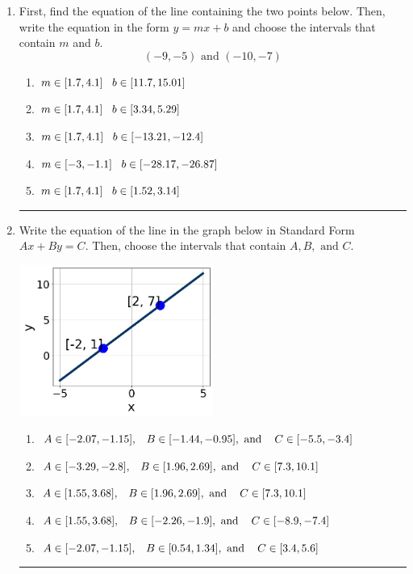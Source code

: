 \documentclass[14pt]{extbook}
\newcommand{\litem}[1]{\item#1\hspace*{-1cm}\rule{\textwidth}{0.4pt}}
\begin{document}
\begin{enumerate}
{\begin{enumerate}[label=\Alph*.]
\end{enumerate} }
\litem{
First, find the equation of the line containing the two points below. Then, write the equation in the form $ y=mx+b $ and choose the intervals that contain $m$ and $b$.\[ (-9, -5) \text{ and } (-10, -7) \]\begin{enumerate}[label=\Alph*.]
\item \( m \in [1.7, 4.1] \hspace*{3mm} b \in [11.7, 15.01] \)
\item \( m \in [1.7, 4.1] \hspace*{3mm} b \in [3.34, 5.29] \)
\item \( m \in [1.7, 4.1] \hspace*{3mm} b \in [-13.21, -12.4] \)
\item \( m \in [-3, -1.1] \hspace*{3mm} b \in [-28.17, -26.87] \)
\item \( m \in [1.7, 4.1] \hspace*{3mm} b \in [1.52, 3.14] \)

\end{enumerate} }
\litem{
Write the equation of the line in the graph below in Standard Form $Ax+By=C$. Then, choose the intervals that contain $A, B, \text{ and } C$.
\begin{center}
    \includegraphics[width=0.5\textwidth]{../Figures/linearGraphToStandardC.png}
\end{center}
\begin{enumerate}[label=\Alph*.]
\item \( A \in [-2.07, -1.15], \hspace{3mm} B \in [-1.44, -0.95], \text{ and } \hspace{3mm} C \in [-5.5, -3.4] \)
\item \( A \in [-3.29, -2.8], \hspace{3mm} B \in [1.96, 2.69], \text{ and } \hspace{3mm} C \in [7.3, 10.1] \)
\item \( A \in [1.55, 3.68], \hspace{3mm} B \in [1.96, 2.69], \text{ and } \hspace{3mm} C \in [7.3, 10.1] \)
\item \( A \in [1.55, 3.68], \hspace{3mm} B \in [-2.26, -1.9], \text{ and } \hspace{3mm} C \in [-8.9, -7.4] \)
\item \( A \in [-2.07, -1.15], \hspace{3mm} B \in [0.54, 1.34], \text{ and } \hspace{3mm} C \in [3.4, 5.6] \)


\end{enumerate}}
\end{enumerate}
\end{document}
